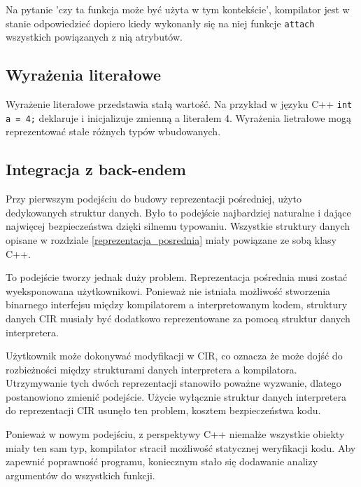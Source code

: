 Na pytanie 'czy ta funkcja może być użyta w tym kontekście', kompilator jest w stanie odpowiedzieć dopiero kiedy wykonanły się na niej funkcje \lstinline{attach} wszystkich powiązanych z nią atrybutów.


\subsection{Wyrażenia literałowe}

Wyrażenie literałowe przedstawia stałą wartość.
Na przykład w języku C++ \lstinline{int a = 4;} deklaruje i inicjalizuje zmienną a literałem 4.
Wyrażenia lietrałowe mogą reprezentować stałe różnych typów wbudowanych.

\subsection{Integracja z back-endem}
\label{backend_integration}
Przy pierwszym podejściu do budowy reprezentacji pośredniej, użyto dedykowanych struktur danych. Było to podejście najbardziej naturalne i dające najwięcej bezpieczeństwa dzięki silnemu typowaniu. Wszystkie struktury danych opisane w rozdziale \ref{reprezentacja_posrednia} miały powiązane ze sobą klasy C++.


To podejście tworzy jednak duży problem. Reprezentacja pośrednia musi zostać wyeksponowana użytkownikowi. Ponieważ nie istniała możliwość stworzenia binarnego interfejsu między kompilatorem a interpretowanym kodem, struktury danych CIR musiały być dodatkowo reprezentowane za pomocą struktur danych interpretera.


Użytkownik może dokonywać modyfikacji w CIR, co oznacza że może dojść do rozbieżności między strukturami danych interpretera a kompilatora. Utrzymywanie tych dwóch reprezentacji stanowiło poważne wyzwanie, dlatego postanowiono zmienić podejście. Użycie wyłącznie struktur danych interpretera do reprezentacji CIR usunęło ten problem, kosztem bezpieczeństwa kodu.


Ponieważ w nowym podejściu, z perspektywy C++ niemalże wszystkie obiekty miały ten sam typ, kompilator stracił możliwość statycznej weryfikacji kodu.
Aby zapewnić poprawność programu, koniecznym stało się dodawanie analizy argumentów do wszystkich funkcji.
